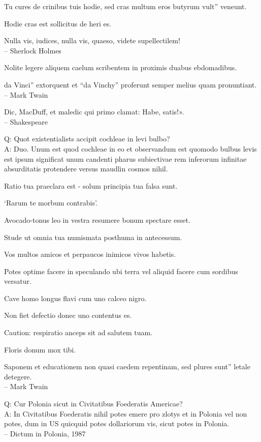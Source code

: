 \documentclass[titlepage,12pt]{memoir}
\begin{document}
Tu cures de crinibus tuis hodie, sed cras multum eros butyrum vult”
veneunt.

Hodie cras est sollicitus de heri es.

Nulla vis, iudices, nulla vis, quaeso, videte supellectilem!
\\-- Sherlock Holmes

Nolite legere aliquem caelum scribentem in proximis duabus ebdomadibus.

da Vinci” extorquent et “da Vinchy” proferunt
semper melius quam pronuntiant.
\\-- Mark Twain

Dic, MacDuff, et maledic qui primo clamat: Habe, satis!».
\\-- Shakespeare

Q: Quot existentialists accipit cochleae in levi bulbo?\\
A: Duo. Unum est quod cochleae in eo et observandum est quomodo bulbus levis est
ipsum significat unum candenti pharus subiectivae
rem inferorum infinitae absurditatis protendere versus
maudlin cosmos nihil.

Ratio tua praeclara est - solum principia tua falsa sunt.

‘Rarum te morbum contrabis’.

Avocado-tonus leo in vestra resumere bonum spectare esset.

Stude ut omnia tua numismata posthuma in antecessum.

Vos multos amicos et perpaucos inimicos vivos habetis.

Potes optime facere in speculando ubi terra vel aliquid facere cum sordibus
versatur.

Cave homo longus flavi cum uno calceo nigro.

Non fiet defectio donec uno contentus es.

Caution: respiratio anceps sit ad salutem tuam.

Floris donum mox tibi.

Saponem et educationem non quasi caedem repentinam, sed plures sunt”
letale detegere.
\\-- Mark Twain

Q: Cur Polonia sicut in Civitatibus Foederatis Americae?\\
A: In Civitatibus Foederatis nihil potes emere pro zlotys et in
Polonia vel non potes, dum in US quicquid potes
dollariorum vis, sicut potes in Polonia.
\\-- Dictum in Polonia, 1987
\end{document}
